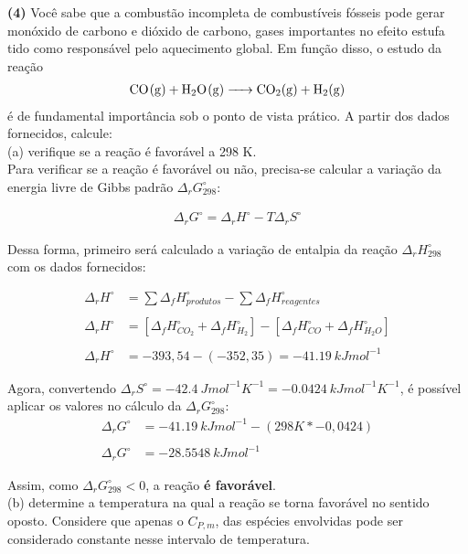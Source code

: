 \textbf{(4)} Você sabe que a combustão incompleta de combustíveis fósseis
pode gerar monóxido de carbono e dióxido de carbono, gases importantes no efeito
estufa tido como responsável pelo aquecimento global. Em função disso, o estudo
da reação
\begin{align*}
    \ce{CO(g) + H2O(g) -> CO2(g) + H2(g)}
\end{align*}
é de fundamental importância sob o ponto de vista prático. A partir dos dados fornecidos,
calcule:\\

(a) verifique se a reação é favorável a 298 K.\\

Para verificar se a reação é favorável ou não, precisa-se calcular a variação da energia livre de Gibbs padrão \( \Delta_rG^\circ_{298}\):

\begin{align*}
	\Delta_rG^\circ = \Delta_rH^\circ - T \Delta_rS^\circ
\end{align*}

Dessa forma, primeiro será calculado a variação de entalpia da reação \( \Delta_rH^\circ_{298}\) com os dados fornecidos:

\begin{align*}
	\Delta_rH^\circ &= \sum\Delta_fH^\circ_{produtos} - \sum\Delta_fH^\circ_{reagentes}\\ \\
	\Delta_rH^\circ &= [\Delta_fH^\circ_{CO_2} + \Delta_fH^\circ_{H_2}] - [ \Delta_fH^\circ_{CO} + \Delta_fH^\circ_{H_2O}]\\ \\
	\Delta_rH^\circ &= -393,54 - (-352,35) = \qty{-41,19}{kJmol^{-1}}
\end{align*}

Agora, convertendo \(\Delta_rS^\circ = \qty{-42,4}{Jmol^{-1}K^{-1}} = \qty{-0,0424}{kJmol^{-1}K^{-1}}\), é possível aplicar os valores no cálculo da \(\Delta_rG^\circ_{298}\):
\begin{align*}
	\Delta_rG^\circ &= \qty{-41,19}{kJmol^{-1}} - (298K * -0,0424) \\ \\
	\Delta_rG^\circ &= \qty{-28,5548}{kJmol^{-1}}
\end{align*}

Assim, como \(\Delta_rG^\circ_{298} < 0\), a reação \textbf{é favorável}. \\ 
 
(b) determine a temperatura na qual a reação se torna favorável no sentido 
oposto. Considere que apenas o \(C_{P,m}\), das espécies envolvidas pode ser
considerado constante nesse intervalo de temperatura.\\

